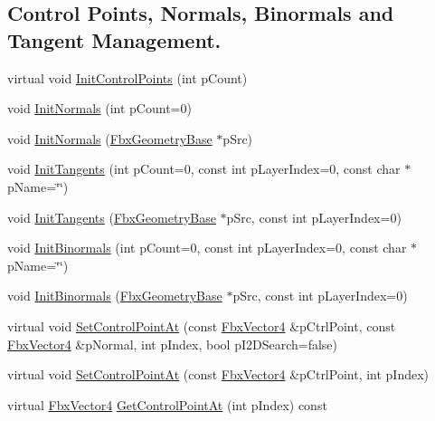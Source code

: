 \subsection*{Control Points, Normals, Binormals and Tangent Management.}
\begin{DoxyCompactItemize}
\item 
virtual void \hyperlink{class_fbx_geometry_base_a471b736f2595c006a338c07a61907127}{Init\+Control\+Points} (int p\+Count)
\item 
void \hyperlink{class_fbx_geometry_base_a4bab80d4a05c813ad635127612f43515}{Init\+Normals} (int p\+Count=0)
\item 
void \hyperlink{class_fbx_geometry_base_ab0eed06f53d189b6c81560b78905c9b0}{Init\+Normals} (\hyperlink{class_fbx_geometry_base}{Fbx\+Geometry\+Base} $\ast$p\+Src)
\item 
void \hyperlink{class_fbx_geometry_base_ac5b188a0deba5132de9805538f014799}{Init\+Tangents} (int p\+Count=0, const int p\+Layer\+Index=0, const char $\ast$p\+Name=\char`\"{}\char`\"{})
\item 
void \hyperlink{class_fbx_geometry_base_ac6b469b25670b8a4c7a17042a96eb314}{Init\+Tangents} (\hyperlink{class_fbx_geometry_base}{Fbx\+Geometry\+Base} $\ast$p\+Src, const int p\+Layer\+Index=0)
\item 
void \hyperlink{class_fbx_geometry_base_abc912331f01b903dee155a1a3dbff0b8}{Init\+Binormals} (int p\+Count=0, const int p\+Layer\+Index=0, const char $\ast$p\+Name=\char`\"{}\char`\"{})
\item 
void \hyperlink{class_fbx_geometry_base_ac19b7cccc9249484196272c1df43b702}{Init\+Binormals} (\hyperlink{class_fbx_geometry_base}{Fbx\+Geometry\+Base} $\ast$p\+Src, const int p\+Layer\+Index=0)
\item 
virtual void \hyperlink{class_fbx_geometry_base_a4f54256d4cbc5e7ae0ae533f7b77ace4}{Set\+Control\+Point\+At} (const \hyperlink{class_fbx_vector4}{Fbx\+Vector4} \&p\+Ctrl\+Point, const \hyperlink{class_fbx_vector4}{Fbx\+Vector4} \&p\+Normal, int p\+Index, bool p\+I2\+D\+Search=false)
\item 
virtual void \hyperlink{class_fbx_geometry_base_ab2d5567b073e6b9f4feb5bb428fa99e4}{Set\+Control\+Point\+At} (const \hyperlink{class_fbx_vector4}{Fbx\+Vector4} \&p\+Ctrl\+Point, int p\+Index)
\item 
virtual \hyperlink{class_fbx_vector4}{Fbx\+Vector4} \hyperlink{class_fbx_geometry_base_a16c45afeb6008d346593882b979f0ed7}{Get\+Control\+Point\+At} (int p\+Index) const
\item 

\end{DoxyCompactItemize}
